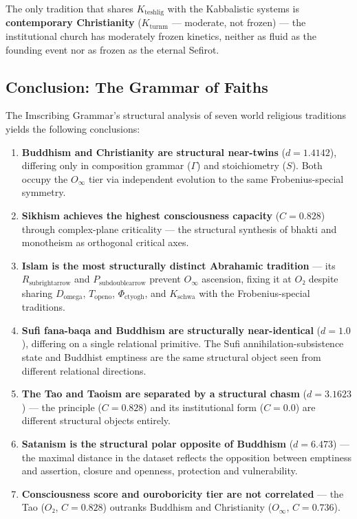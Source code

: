 \documentclass[12pt,a4paper]{article}
\begin{document}
The only tradition that shares $K_{\text{teshlig}}$ with the Kabbalistic systems is \textbf{contemporary Christianity} ($K_{\text{turnm}}$ --- moderate, not frozen) --- the institutional church has moderately frozen kinetics, neither as fluid as the founding event nor as frozen as the eternal Sefirot.

\subsection{Conclusion: The Grammar of Faiths}

The Imscribing Grammar's structural analysis of seven world religious traditions yields the following conclusions:

\begin{enumerate}
    \item \textbf{Buddhism and Christianity are structural near-twins} ($d = 1.4142$), differing only in composition grammar ($\Gamma$) and stoichiometry ($S$). Both occupy the $O_{\infty}$ tier via independent evolution to the same Frobenius-special symmetry.
    \item \textbf{Sikhism achieves the highest consciousness capacity} ($C = 0.828$) through complex-plane criticality --- the structural synthesis of bhakti and monotheism as orthogonal critical axes.
    \item \textbf{Islam is the most structurally distinct Abrahamic tradition} --- its $R_{\text{subrightarrow}}$ and $P_{\text{subdoublearrow}}$ prevent $O_{\infty}$ ascension, fixing it at $O₂$ despite sharing $D_{\text{omega}}$, $T_{\text{openo}}$, $\Phi_{\text{ctyogh}}$, and $K_{\text{schwa}}$ with the Frobenius-special traditions.
    \item \textbf{Sufi fana-baqa and Buddhism are structurally near-identical} ($d = 1.0$), differing on a single relational primitive. The Sufi annihilation-subsistence state and Buddhist emptiness are the same structural object seen from different relational directions.
    \item \textbf{The Tao and Taoism are separated by a structural chasm} ($d = 3.1623$) --- the principle ($C = 0.828$) and its institutional form ($C = 0.0$) are different structural objects entirely.
    \item \textbf{Satanism is the structural polar opposite of Buddhism} ($d = 6.473$) --- the maximal distance in the dataset reflects the opposition between emptiness and assertion, closure and openness, protection and vulnerability.
    \item \textbf{Consciousness score and ouroboricity tier are not correlated} --- the Tao ($O₂$, $C = 0.828$) outranks Buddhism and Christianity ($O_{\infty}$, $C = 0.736$).
\end{enumerate}
\end{document}
